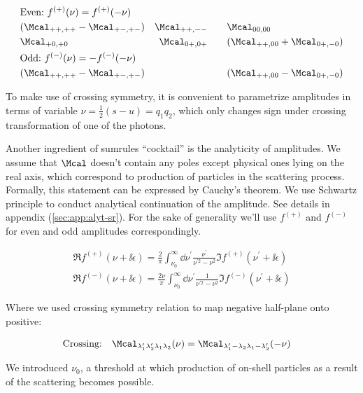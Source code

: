 \begin{align}
    &\text{Even:}~f^{(+)}(\nu) = f^{(+)}(-\nu) && \\ \nonumber
    &(\Mcal_{++,++}-\Mcal_{+-,+-}) &\Mcal_{++,--}\qquad &\Mcal_{00,00}\\
    &\Mcal_{+0,+0} &\Mcal_{0+,0+}\qquad &(\Mcal_{++,00} + \Mcal_{0+,-0})\\
    &\text{Odd:}~f^{(-)}(\nu) = -f^{(-)}(-\nu) && \\ \nonumber
    &(\Mcal_{++,++} - \Mcal_{+-,+-}) & &(\Mcal_{++,00} - \Mcal_{0+,-0})
\end{align}

To make use of crossing symmetry, it is convenient to parametrize amplitudes in terms of variable $\nu = \frac{1}{2} (s - u) = q_1 q_2$, which only changes sign under crossing transformation of one of the photons.

Another ingredient of sumrules ``cocktail'' is the analyticity of amplitudes. We assume that $\Mcal$ doesn't contain any poles except physical ones lying on the real axis, which correspond to production of particles in the scattering process. Formally, this statement can be expressed by Cauchy's theorem. We use Schwartz principle to conduct analytical continuation of the amplitude. See details in appendix (\cref{sec:app:alyt-sr}). For the sake of generality we'll use $f^{(+)}$ and $f^{(-)}$ for even and odd amplitudes correspondingly.

\begin{align}
    \Re f^{(+)}(\nu + \ii \epsilon) = \frac{2}{\pi} \int_{\nu_0}^{\infty} \dd{\nu^\prime} \frac{\nu^\prime}{\nu^{\prime 2} - \nu^2} \Im f^{(+)}(\nu^\prime + \ii \epsilon) \\
    \Re f^{(-)}(\nu + \ii \epsilon) = \frac{2\nu}{\pi} \int_{\nu_0}^{\infty} \dd{\nu^\prime} \frac{1}{\nu^{\prime 2} - \nu^2} \Im f^{(-)}(\nu^\prime + \ii \epsilon)
\end{align}

Where we used crossing symmetry relation to map negative half-plane onto positive:

\begin{align}
    & \text{Crossing:}\quad \Mcal_{\lambda_1^\prime \lambda_2^\prime \lambda_1 \lambda_2}(\nu) = \Mcal_{\lambda_1^\prime -\lambda_2 \lambda_1 -\lambda_2^\prime}(-\nu)
\end{align}


We introduced $\nu_0$, a threshold at which production of on-shell particles as a result of the scattering becomes possible.

